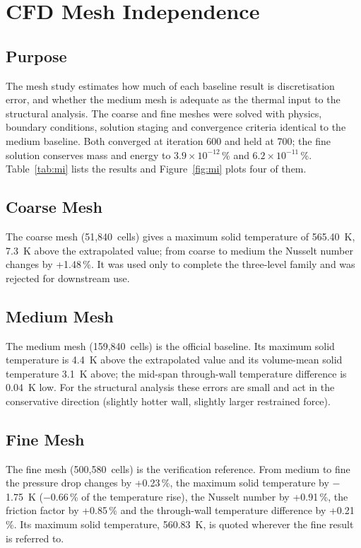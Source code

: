 \chapter{CFD Mesh Independence}\label{ch:mi}

\section{Purpose}
The mesh study estimates how much of each baseline result is discretisation error, and whether the medium mesh is adequate as the thermal
input to the structural analysis. The coarse and fine meshes were solved with physics, boundary conditions, solution staging and convergence
criteria identical to the medium baseline. Both converged at iteration 600 and held at 700; the fine solution conserves mass and energy to
$3.9\times10^{-12}$\,\% and $6.2\times10^{-11}$\,\%. Table~\ref{tab:mi} lists the results and Figure~\ref{fig:mi} plots four of them.



\section{Coarse Mesh}
The coarse mesh (51,840~cells) gives a maximum solid temperature of 565.40~K, 7.3~K above the extrapolated value; from coarse to medium the Nusselt number
changes by +1.48\,\%. It was used only to complete the three-level family and was rejected for downstream use.

\section{Medium Mesh}
The medium mesh (159,840~cells) is the official baseline. Its maximum solid temperature is 4.4~K above the extrapolated value and its
volume-mean solid temperature 3.1~K above; the mid-span through-wall temperature difference is 0.04~K low. For the structural analysis these
errors are small and act in the conservative direction (slightly hotter wall, slightly larger restrained force).

\section{Fine Mesh}
The fine mesh (500,580~cells) is the verification reference. From medium to fine the pressure drop changes by +0.23\,\%, the maximum solid
temperature by $-$1.75~K ($-$0.66\,\% of the temperature rise), the Nusselt number by +0.91\,\%, the friction factor by +0.85\,\% and the
through-wall temperature difference by +0.21\,\%. Its maximum solid temperature, 560.83~K, is quoted wherever the fine result is referred to.

